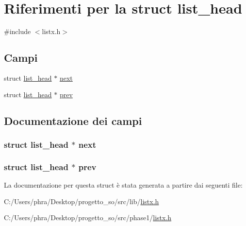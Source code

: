 \hypertarget{structlist__head}{\section{Riferimenti per la struct list\-\_\-head}
\label{structlist__head}
}


{\ttfamily \#include $<$listx.\-h$>$}

\subsection*{Campi}
\begin{DoxyCompactItemize}
\item 
struct \hyperlink{structlist__head}{list\-\_\-head} $\ast$ \hyperlink{structlist__head_afb6f2172d12efd37f00bb623a6885f2a}{next}
\item 
struct \hyperlink{structlist__head}{list\-\_\-head} $\ast$ \hyperlink{structlist__head_ad8f06cb209b17c3a4a5b24cad8793f72}{prev}
\end{DoxyCompactItemize}


\subsection{Documentazione dei campi}
\hypertarget{structlist__head_afb6f2172d12efd37f00bb623a6885f2a}{
\subsubsection[{next}]{\setlength{\rightskip}{0pt plus 5cm}struct {\bf list\-\_\-head} $\ast$ next}}\label{structlist__head_afb6f2172d12efd37f00bb623a6885f2a}
\hypertarget{structlist__head_ad8f06cb209b17c3a4a5b24cad8793f72}{
\subsubsection[{prev}]{\setlength{\rightskip}{0pt plus 5cm}struct {\bf list\-\_\-head} $\ast$ prev}}\label{structlist__head_ad8f06cb209b17c3a4a5b24cad8793f72}


La documentazione per questa struct è stata generata a partire dai seguenti file\-:\begin{DoxyCompactItemize}
\item 
C\-:/\-Users/phra/\-Desktop/progetto\-\_\-so/src/lib/\hyperlink{lib_2listx_8h}{listx.\-h}\item 
C\-:/\-Users/phra/\-Desktop/progetto\-\_\-so/src/phase1/\hyperlink{phase1_2listx_8h}{listx.\-h}\end{DoxyCompactItemize}

